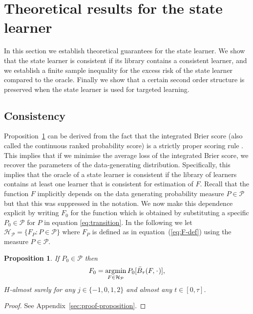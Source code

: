 \documentclass[unnumsec,webpdf,contemporary,large,namedate]{oup-authoring-template}%
\theoremstyle{thmstyleone}%
\newtheorem{proposition}{Proposition}
\theoremstyle{thmstyletwo}%
\theoremstyle{thmstylethree}%
\DeclareMathOperator{\E}{\mathbb{E}} %
\newcommand{\blank}{\makebox[1ex]{\textbf{$\cdot$}}}
\renewcommand{\phi}{\varphi}
\newcommand{\1}{\mathds{1}}
\DeclareMathOperator*{\argmin}{\arg\!\min}
\begin{document}
\section{Theoretical results for the state learner}
\label{sec:theor-results-prop}

In this section we establish theoretical guarantees for the state learner. We
show that the state learner is consistent if its library contains a consistent
learner, and we establish a finite sample inequality for the excess risk of the
state learner compared to the oracle. Finally we show that a certain second
order structure is preserved when the state learner is used for targeted
learning.

\subsection{Consistency}
\label{sec:consistency}

Proposition~\ref{prop:stric-prop} can be derived from the fact that the
integrated Brier score (also called the continuous ranked probability score) is
a strictly proper scoring rule \citep{gneiting2007strictly}. This implies that
if we minimise the average loss of the integrated Brier score, we recover the
parameters of the data-generating distribution. Specifically, this implies that
the oracle of a state learner is consistent if the library of learners contains
at least one learner that is consistent for estimation of \( F \). Recall that
the function \(F\) implicitly depends on the data generating probability measure
\(P\in\mathcal P\) but that this was suppressed in the notation. We now make
this dependence explicit by writing \(F_0\) for the function which is obtained
by substituting a specific \(P_0\in\mathcal{P}\) for \(P\) in equation
\eqref{eq:transition}. In the following we let
\( \mathcal{H}_{\mathcal{P}} = \{F_P : P \in \mathcal{P}\} \) where \( F_P \) is defined as in
equation~(\ref{eq:F-def}) using the measure \( P \in \mathcal{P} \).

\begin{proposition}
  \label{prop:stric-prop}
  If \(P_0\in\mathcal{P}\) then
  \begin{equation*}
    F_0 = \argmin_{F \in \mathcal{H}_{\mathcal{P}}} P_0{[\bar{B}_\tau(F, \blank)]},
  \end{equation*}
  \( H \)-almost surely for any \( j\in \{-1,0,1,2\} \) and almost any
  \( t \in [0, \tau]\).
\end{proposition}
\begin{proof}
  See Appendix~\ref{sec:proof-proposition}.
\end{proof}
\end{document}
